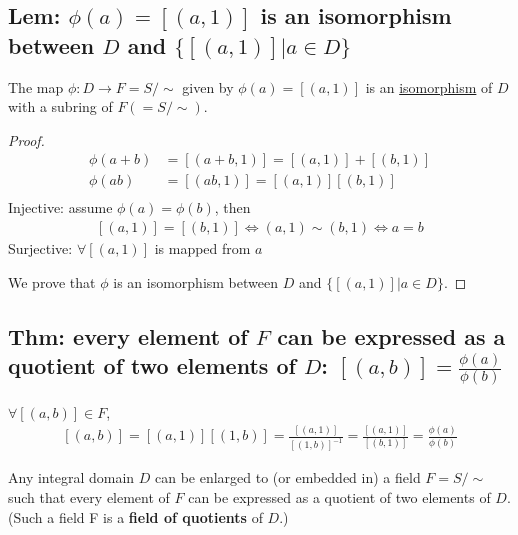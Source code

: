 \documentclass[11pt]{elegantbook}
\begin{document}
\subsection{Lem: $\phi(a)=[(a,1)]$ is an isomorphism between $D$ and $\{[(a,1)]|a\in D\}$}
\begin{lemma}
    The map $\phi : D \rightarrow F=S/\sim$ given by $\phi(a) = [(a, 1)]$ is an \underline{isomorphism} of $D$ with a subring of $F(=S/\sim)$.
\end{lemma}
\begin{proof}
    \begin{equation}
        \begin{aligned}
            \phi(a+b) &= [(a+b, 1)]=[(a,1)]+[(b,1)]\\
            \phi(ab) &= [(ab, 1)]=[(a,1)][(b,1)]\\
        \end{aligned}
        \nonumber
    \end{equation}
    Injective: assume $\phi(a)=\phi(b)$, then
    \begin{equation}
        \begin{aligned}
            [(a, 1)]=[(b,1)]\Leftrightarrow	(a,1)\sim (b,1) \Leftrightarrow	a=b
        \end{aligned}
        \nonumber
    \end{equation}
    Surjective: $\forall [(a,1)]$ is mapped from $a$

    We prove that $\phi$ is an isomorphism between $D$ and $\{[(a,1)]|a\in D\}$.
\end{proof}

\subsection{Thm: every
element of $F$ can be expressed as a quotient of two elements of $D$: $[(a,b)]=\frac{\phi(a)}{\phi(b)}$}
$\forall [(a,b)]\in F$,
\begin{equation}
    \begin{aligned}
        [(a,b)]=[(a,1)][(1,b)]=\frac{[(a,1)]}{[(1,b)]^{-1}}=\frac{[(a,1)]}{[(b,1)]}=\frac{\phi(a)}{\phi(b)}
    \end{aligned}
    \nonumber
\end{equation}
\begin{theorem}
    Any integral domain $D$ can be enlarged to (or embedded in) a field $F=S/\sim$ such that every
    element of $F$ can be expressed as a quotient of two elements of $D$. (Such a field F is a
    \textbf{field of quotients} of $D$.)
\end{theorem}
\end{document}
